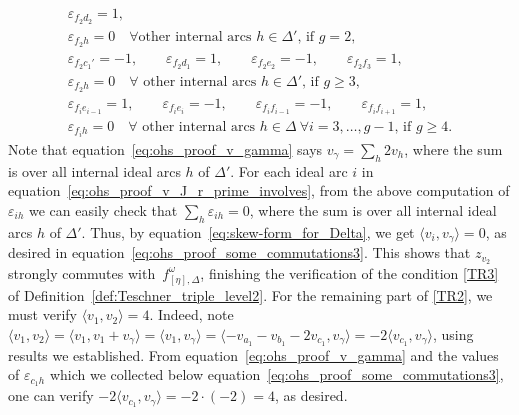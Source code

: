 \documentclass[pdftex]{sigma}
\numberwithin{equation}{section}
\theoremstyle{definition}
\begin{document}
\begin{gather*}
\varepsilon_{f_2 d_2}=1,\\
\varepsilon_{f_2 h}=0 \quad \mbox{$\forall$other internal arcs $h\in \Delta'$, if $g=2$}, \\
 \varepsilon_{f_2 c_1'}=-1,\qquad
\varepsilon_{f_2 d_1}=1,\qquad
\varepsilon_{f_2 e_2}=-1,\qquad
\varepsilon_{f_2 f_3}=1,\\
\varepsilon_{f_2 h}=0 \quad \mbox{$\forall$ other internal arcs $h\in \Delta'$, if $g\ge 3$}, \\
 \varepsilon_{f_i e_{i-1}}=1,\qquad
\varepsilon_{f_i e_i}=-1,\qquad
\varepsilon_{f_i f_{i-1}}=-1,\qquad
\varepsilon_{f_i f_{i+1}}=1,\\
\varepsilon_{f_i h}=0 \quad \mbox{$\forall$ other internal arcs $h\in \Delta$} \
 \mbox{$\forall i=3,\dots,g-1$, if $g\ge 4$}.
\end{gather*}
Note that equation~\eqref{eq:ohs_proof_v_gamma} says $v_\gamma = \sum_h 2 v_h$, where the sum is over all internal ideal arcs $h$ of $\Delta'$. For each ideal arc $i$ in equation~\eqref{eq:ohs_proof_v_J_r_prime_involves}, from the above computation of $\varepsilon_{ih}$ we can easily check that $\sum_h \varepsilon_{ih}=0$, where the sum is over all internal ideal arcs $h$ of $\Delta'$. Thus, by equation~\eqref{eq:skew-form_for_Delta}, we get $\langle v_i, v_\gamma\rangle =0$, as desired in equation~\eqref{eq:ohs_proof_some_commutations3}. This shows that $z_{v_2}$ strongly commutes with~$f^\omega_{[\eta],\Delta}$, finishing the verification of the condition \ref{TR3} of Definition~\ref{def:Teschner_triple_level2}.
For the remaining part of \ref{TR2}, we must verify $\langle v_1, v_2 \rangle=4$. Indeed, note $\langle v_1, v_2 \rangle = \langle v_1, v_1 + v_\gamma \rangle = \langle v_1, v_\gamma \rangle = \langle - v_{a_1} - v_{b_1} - 2v_{c_1}, v_\gamma\rangle = -2 \langle v_{c_1}, v_\gamma\rangle$, using results we established. From equation~\eqref{eq:ohs_proof_v_gamma} and the values of $\varepsilon_{c_1 h}$ which we collected below equation~\eqref{eq:ohs_proof_some_commutations3}, one can verify $-2 \langle v_{c_1}, v_\gamma\rangle = -2 \cdot (-2) = 4$, as desired.
\end{document}
